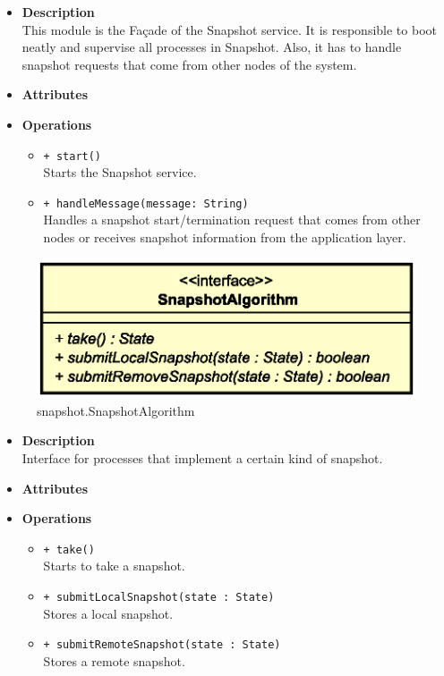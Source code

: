 \FloatBarrier
\begin{itemize}
  \item \textbf{Description} \\
    This module is the Fa\c cade of the Snapshot service. It is responsible
    to boot neatly and supervise all processes in Snapshot. Also, it has to
    handle snapshot requests that come from other nodes of the system.
  \item \textbf{Attributes}
  \item \textbf{Operations}
  \begin{itemize}
    \item \texttt{+ start()} \\
    Starts the Snapshot service.
    \item \texttt{+ handleMessage(message: String)} \\
    Handles a snapshot start/termination request that comes from other nodes
    or receives snapshot information from the application layer.
  \end{itemize}
\end{itemize}


\begin{figure}[H]
  \centering
  \includegraphics[width=.5\columnwidth]{images/solution/mw/sn/snalg.eps}
  \caption{snapshot.SnapshotAlgorithm}
  \label{fig:mw-snapshot-snapshotalgorithm}
\end{figure}

\FloatBarrier
\begin{itemize}
  \item \textbf{Description} \\
    Interface for processes that implement a certain kind of snapshot.
  \item \textbf{Attributes}
  \item \textbf{Operations}
  \begin{itemize}
    \item \texttt{+ take()} \\
    Starts to take a snapshot.
    \item \texttt{+ submitLocalSnapshot(state : State)} \\
    Stores a local snapshot.
    \item \texttt{+ submitRemoteSnapshot(state : State)} \\
    Stores a remote snapshot.
  \end{itemize}
\end{itemize}

